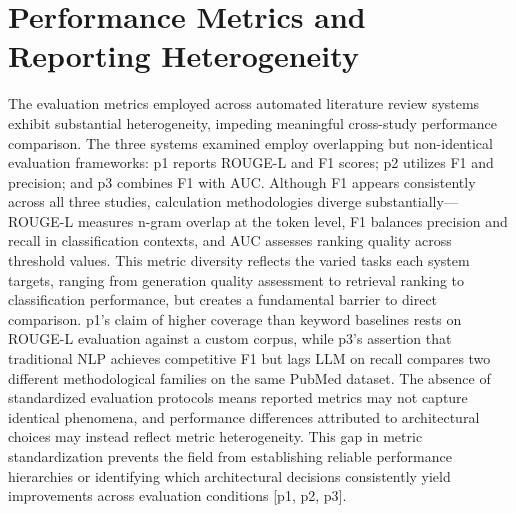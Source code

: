 \documentclass{article}
\begin{document}
\section{Performance Metrics and Reporting Heterogeneity}
The evaluation metrics employed across automated literature review systems exhibit substantial heterogeneity, impeding meaningful cross-study performance comparison. The three systems examined employ overlapping but non-identical evaluation frameworks: p1 reports ROUGE-L and F1 scores; p2 utilizes F1 and precision; and p3 combines F1 with AUC. Although F1 appears consistently across all three studies, calculation methodologies diverge substantially—ROUGE-L measures n-gram overlap at the token level, F1 balances precision and recall in classification contexts, and AUC assesses ranking quality across threshold values. This metric diversity reflects the varied tasks each system targets, ranging from generation quality assessment to retrieval ranking to classification performance, but creates a fundamental barrier to direct comparison. p1's claim of higher coverage than keyword baselines rests on ROUGE-L evaluation against a custom corpus, while p3's assertion that traditional NLP achieves competitive F1 but lags LLM on recall compares two different methodological families on the same PubMed dataset. The absence of standardized evaluation protocols means reported metrics may not capture identical phenomena, and performance differences attributed to architectural choices may instead reflect metric heterogeneity. This gap in metric standardization prevents the field from establishing reliable performance hierarchies or identifying which architectural decisions consistently yield improvements across evaluation conditions [p1, p2, p3].
\end{document}
